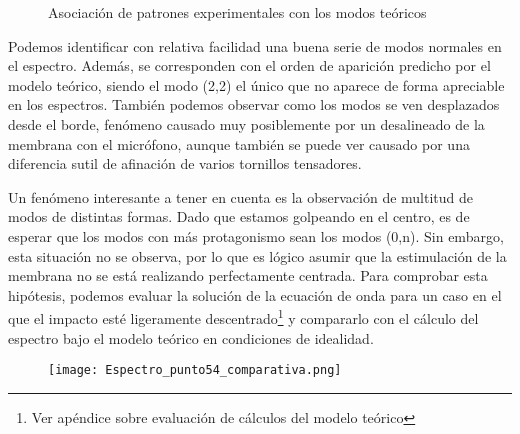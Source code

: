 \documentclass[journal, a4paper,onecolumn]{IEEEtran}
\begin{document}
    \begin{figure}[H]%
    \centering
    
  
    \end{figure}
    
     \begin{figure}[H]%
    \centering
    
   \caption{Asociación de patrones experimentales con los modos teóricos  }
    \end{figure}
    
Podemos identificar con relativa facilidad una buena serie de modos normales en el espectro. Además, se corresponden con el orden de aparición predicho por el modelo teórico, siendo el modo (2,2) el único que no aparece de forma apreciable en los espectros. También podemos observar como los modos se ven desplazados desde el borde, fenómeno causado muy posiblemente por un desalineado de la membrana con el micrófono, aunque también se puede ver causado por una diferencia sutil de afinación de varios tornillos tensadores.\newline

Un fenómeno interesante a tener en cuenta es la observación de multitud de modos de distintas formas. Dado que estamos golpeando en el centro, es de esperar que los modos con más protagonismo sean los modos (0,n). Sin embargo, esta situación no se observa, por lo que es lógico asumir que la estimulación de la membrana no se está realizando perfectamente centrada. Para comprobar esta hipótesis, podemos evaluar la solución de la ecuación de onda para un caso en el que el impacto esté ligeramente descentrado\footnote{Ver apéndice sobre evaluación de cálculos del modelo teórico} y compararlo con el cálculo del espectro bajo el modelo teórico en condiciones de idealidad.\newline

 \begin{figure}[H]
    \centering
    \texttt{[image: Espectro\_punto54\_comparativa.png]} 

    \end{figure}
    
\end{document}
